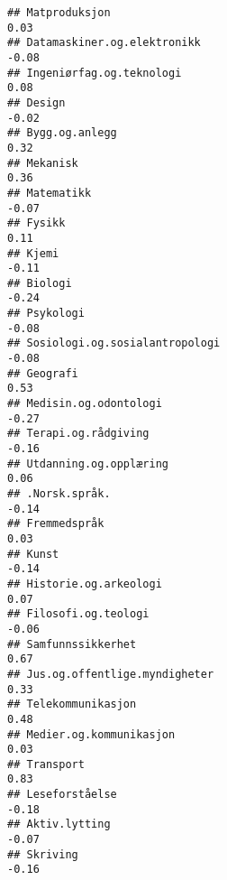 \documentclass[
]{article}
\begin{document}
\begin{verbatim}
## Matproduksjon                                                                     0.03
## Datamaskiner.og.elektronikk                                                      -0.08
## Ingeniørfag.og.teknologi                                                          0.08
## Design                                                                           -0.02
## Bygg.og.anlegg                                                                    0.32
## Mekanisk                                                                          0.36
## Matematikk                                                                       -0.07
## Fysikk                                                                            0.11
## Kjemi                                                                            -0.11
## Biologi                                                                          -0.24
## Psykologi                                                                        -0.08
## Sosiologi.og.sosialantropologi                                                   -0.08
## Geografi                                                                          0.53
## Medisin.og.odontologi                                                            -0.27
## Terapi.og.rådgiving                                                              -0.16
## Utdanning.og.opplæring                                                            0.06
## .Norsk.språk.                                                                    -0.14
## Fremmedspråk                                                                      0.03
## Kunst                                                                            -0.14
## Historie.og.arkeologi                                                             0.07
## Filosofi.og.teologi                                                              -0.06
## Samfunnssikkerhet                                                                 0.67
## Jus.og.offentlige.myndigheter                                                     0.33
## Telekommunikasjon                                                                 0.48
## Medier.og.kommunikasjon                                                           0.03
## Transport                                                                         0.83
## Leseforståelse                                                                   -0.18
## Aktiv.lytting                                                                    -0.07
## Skriving                                                                         -0.16

\end{verbatim}
\end{document}

